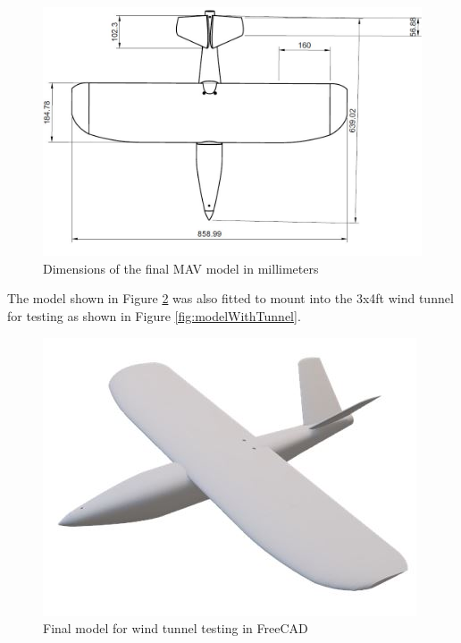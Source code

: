\begin{figure}
    \centering
    \includegraphics{04_Methodology/Figs/dimensions.JPG}
    
    \caption{Dimensions of the final MAV model in millimeters}
    \label{fig:dimension22}
\end{figure}

The model shown in Figure \ref{fig:freeCADModel} was also fitted to mount into the 3x4ft wind tunnel for testing as shown in Figure \ref{fig:modelWithTunnel}.

\begin{figure}[H]
\centering
\includegraphics[]{04_Methodology/Figs/model2.jpg}
\caption{Final model for wind tunnel testing in FreeCAD}
\label{fig:freeCADModel}
\end{figure}


